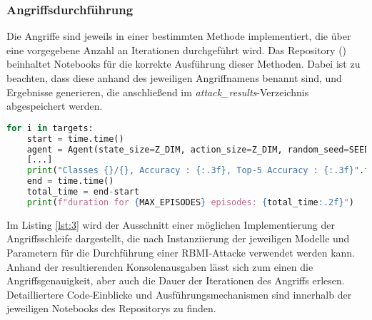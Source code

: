 \subsubsection{Angriffsdurchführung}
Die Angriffe sind jeweils in einer bestimmten Methode implementiert, die über eine vorgegebene Anzahl an Iterationen durchgeführt wird. Das Repository (\cite{weber_hosthansba_code_2024}) beinhaltet Notebooks für die korrekte Ausführung dieser Methoden. Dabei ist zu beachten, dass diese anhand des jeweiligen Angriffnamens benannt sind, und Ergebnisse generieren, die anschließend im \textit{attack\_results}-Verzeichnis abgespeichert werden.
\begin{lstlisting}[language=Python, caption=Angriffsschleife einer RBMI-Attacke, label=lst:3]
for i in targets:
	start = time.time()
	agent = Agent(state_size=Z_DIM, action_size=Z_DIM, random_seed=SEED, hidden_size=256, action_prior="uniform")
	[...]
	print("Classes {}/{}, Accuracy : {:.3f}, Top-5 Accuracy : {:.3f}".format(total, N_TARGET, acc, acc5))
	end = time.time()
	total_time = end-start
	print(f"duration for {MAX_EPISODES} episodes: {total_time:.2f}")
\end{lstlisting}
Im Listing \ref{lst:3} wird der Ausschnitt einer möglichen Implementierung der Angriffsschleife dargestellt, die nach Instanziierung der jeweiligen Modelle und Parametern für die Durchführung einer RBMI-Attacke verwendet werden kann. Anhand der resultierenden Konsolenausgaben lässt sich zum einen die Angriffsgenauigkeit, aber auch die Dauer der Iterationen des Angriffs erlesen. Detailliertere Code-Einblicke und Ausführungsmechanismen sind innerhalb der jeweiligen Notebooks des Repositorys zu finden.